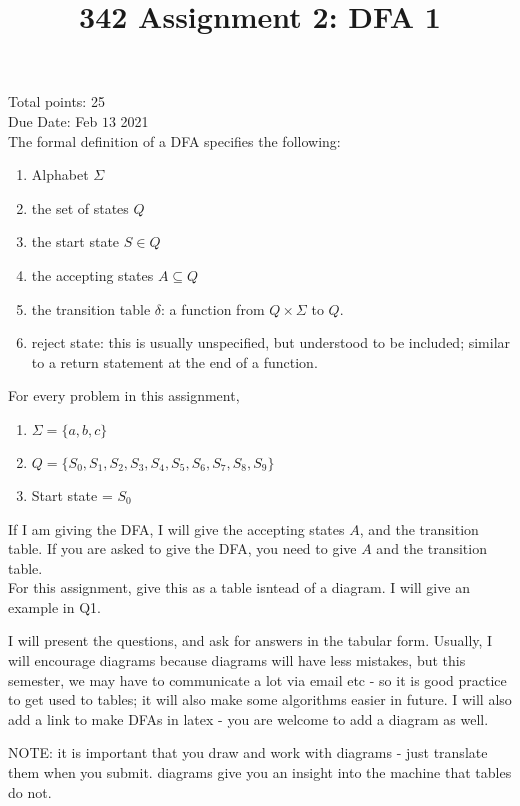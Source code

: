 \documentclass[10pt]{article}
\title{342 Assignment 2: DFA 1}
\begin{document}
\maketitle

Total points: 25\\
Due Date: Feb $13$ 2021\\

The formal definition of a DFA specifies the following:\\
\begin{enumerate}
    \item Alphabet $\Sigma$
    \item the set of states $Q$
    \item the start state $S \in Q$
    \item the accepting states $A \subseteq  Q$
    \item the transition table $\delta$: a function from $Q \times \Sigma$ to $Q$.
    \item reject state: this is usually unspecified, but understood to be included; similar to a return statement at the end of a function.
\end{enumerate}

For every problem in this assignment, 
\begin{enumerate}
    \item $\Sigma = \{a,b,c\}$
    \item $Q = \{S_0,S_1,S_2,S_3,S_4,S_5,S_6,S_7,S_8,S_9\}$
    \item Start state = $S_0$ 
\end{enumerate}
If I am giving the DFA, I will give the accepting states $A$, and the transition table. If you are asked to give the DFA, you need to give $A$ and the transition table.\\ 
For this assignment, give this as a table isntead of a diagram. I will give an example in Q1.

I will present the questions, and ask for answers in the tabular form. Usually, I will encourage diagrams because diagrams will have less mistakes, but this semester, we may have to communicate a lot via email etc - so it is good practice to get used to tables; it will also make some algorithms easier in future. I will also add a link to make DFAs in latex - you are welcome to add a diagram as well.

NOTE: it is important that you draw and work with diagrams - just translate them when you submit. diagrams give you an insight into  the machine that tables do not.
\end{document}
